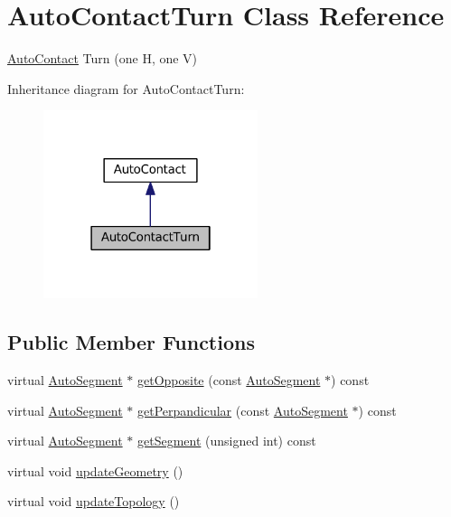 \hypertarget{classKatabatic_1_1AutoContactTurn}{}\section{Auto\+Contact\+Turn Class Reference}
\label{classKatabatic_1_1AutoContactTurn}


\mbox{\hyperlink{classKatabatic_1_1AutoContact}{Auto\+Contact}} Turn (one H, one V)  




Inheritance diagram for Auto\+Contact\+Turn\+:\nopagebreak
\begin{figure}[H]
\begin{center}
\leavevmode
\includegraphics[width=178pt]{classKatabatic_1_1AutoContactTurn__inherit__graph}
\end{center}
\end{figure}
\subsection*{Public Member Functions}
\begin{DoxyCompactItemize}
\item 
virtual \mbox{\hyperlink{classKatabatic_1_1AutoSegment}{Auto\+Segment}} $\ast$ \mbox{\hyperlink{classKatabatic_1_1AutoContactTurn_ac9c9b04e245a1109e297510a3968b7ac}{get\+Opposite}} (const \mbox{\hyperlink{classKatabatic_1_1AutoSegment}{Auto\+Segment}} $\ast$) const
\item 
virtual \mbox{\hyperlink{classKatabatic_1_1AutoSegment}{Auto\+Segment}} $\ast$ \mbox{\hyperlink{classKatabatic_1_1AutoContactTurn_ad99dd549214e43b6509fd8e3aefae919}{get\+Perpandicular}} (const \mbox{\hyperlink{classKatabatic_1_1AutoSegment}{Auto\+Segment}} $\ast$) const
\item 
virtual \mbox{\hyperlink{classKatabatic_1_1AutoSegment}{Auto\+Segment}} $\ast$ \mbox{\hyperlink{classKatabatic_1_1AutoContactTurn_a99fa8a78e97a29f2fb5730eaaa59acfc}{get\+Segment}} (unsigned int) const
\item 
virtual void \mbox{\hyperlink{classKatabatic_1_1AutoContactTurn_a3e218f6934c51380fb15d0e2bd380071}{update\+Geometry}} ()
\item 
virtual void \mbox{\hyperlink{classKatabatic_1_1AutoContactTurn_af5bf1f5e71204ef84346e4e036175431}{update\+Topology}} ()
\end{DoxyCompactItemize}
